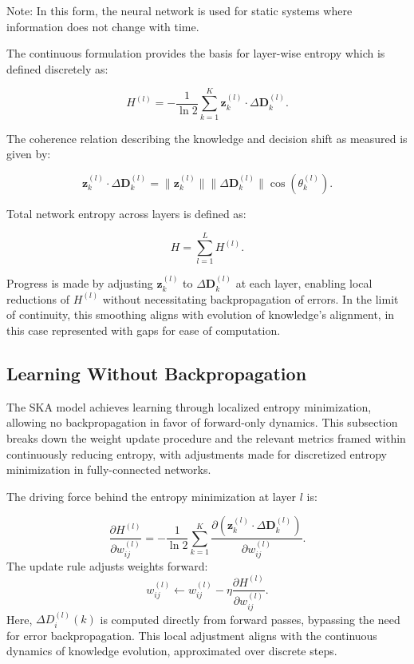 \documentclass{article}
\begin{document}
Note: In this form, the neural network is used for static systems where information does not change with time.


The continuous formulation provides the basis for layer-wise entropy which is defined discretely as: 

\begin{equation}
	H^{(l)} = -\frac{1}{\ln 2} \sum_{k=1}^{K} \mathbf{z}^{(l)}_k \cdot \Delta \mathbf{D}^{(l)}_k.
\end{equation}

The coherence relation describing the knowledge and decision shift as measured is given by: 

\begin{equation}
	\mathbf{z}^{(l)}_k \cdot \Delta \mathbf{D}^{(l)}_k = \|\mathbf{z}^{(l)}_k\| \| \Delta \mathbf{D}^{(l)}_k\| \cos(\theta^{(l)}_k).
\end{equation}

Total network entropy across layers is defined as: 

\begin{equation}
	H = \sum_{l=1}^{L} H^{(l)}.
\end{equation}


Progress is made by adjusting \( \mathbf{z}^{(l)}_k \) to \( \Delta \mathbf{D}^{(l)}_k \) at each layer, enabling local reductions of \( H^{(l)} \) without necessitating backpropagation of errors. In the limit of continuity, this smoothing aligns with evolution of knowledge’s alignment, in this case represented with gaps for ease of computation.


\subsection{Learning Without Backpropagation}

The SKA model achieves learning through localized entropy minimization, allowing no backpropagation in favor of forward-only dynamics. This subsection breaks down the weight update procedure and the relevant metrics framed within continuously reducing entropy, with adjustments made for discretized entropy minimization in fully-connected networks.  

The driving force behind the entropy minimization at layer \( l \) is:


\begin{equation}
	\frac{\partial H^{(l)}}{\partial w_{ij}^{(l)}} = -\frac{1}{\ln 2} \sum_{k=1}^{K} \frac{\partial (\mathbf{z}^{(l)}_k \cdot \Delta \mathbf{D}^{(l)}_k)}{\partial w_{ij}^{(l)}}.
\end{equation}
The update rule adjusts weights forward:
\begin{equation}
	w_{ij}^{(l)} \leftarrow w_{ij}^{(l)} - \eta \frac{\partial H^{(l)}}{\partial w_{ij}^{(l)}}.
\end{equation}
Here, \( \Delta D_i^{(l)}(k) \) is computed directly from forward passes, bypassing the need for error backpropagation. This local adjustment aligns with the continuous dynamics of knowledge evolution, approximated over discrete steps.
\end{document}
